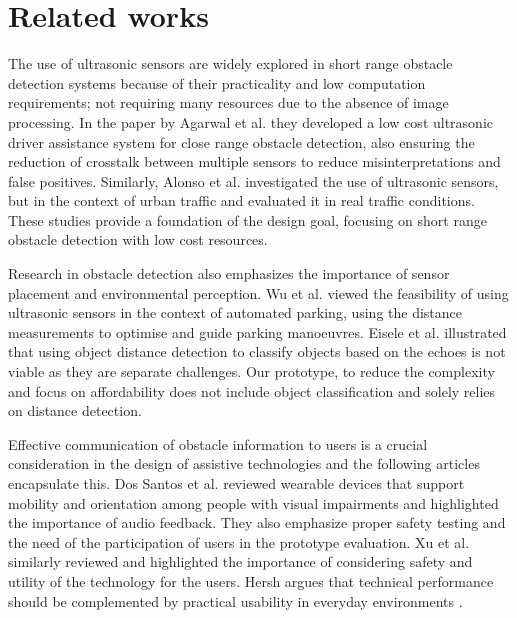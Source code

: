 \documentclass[12pt]{article}
\begin{document}
\section{Related works}
The use of ultrasonic sensors are widely explored in short range obstacle detection systems because of their practicality and low computation requirements; not requiring many resources due to the absence of image processing. In the paper by Agarwal et al. \cite{agarwal2009cost} they developed a low cost ultrasonic driver assistance system for close range obstacle detection, also ensuring the reduction of crosstalk between multiple sensors to reduce misinterpretations and false positives. Similarly, Alonso et al. \cite{alonso2011ultasonic} investigated the use of ultrasonic sensors, but in the context of urban traffic and evaluated it in real traffic conditions. These studies provide a foundation of the design goal, focusing on short range obstacle detection with low cost resources.

Research in obstacle detection also emphasizes the importance of sensor placement and environmental perception. Wu et al. \cite{wu2019implementation} viewed the feasibility of using ultrasonic sensors in the context of automated parking, using the distance measurements to optimise and guide parking manoeuvres. Eisele et al. \cite{eisele2024relevance} illustrated that using object distance detection to classify objects based on the echoes is not viable as they are separate challenges. Our prototype, to reduce the complexity and focus on affordability does not include object classification and solely relies on distance detection.

Effective communication of obstacle information to users is a crucial consideration in the design of assistive technologies and the following articles encapsulate this. Dos Santos et al. \cite{dos2021systematic} reviewed wearable devices that support mobility and orientation among people with visual impairments and highlighted the importance of audio feedback. They also emphasize proper safety testing and the need of the participation of users in the prototype evaluation. Xu et al. \cite{xu2023wearable} similarly reviewed and highlighted the importance of considering safety and utility of the technology for the users. Hersh argues that technical performance should be complemented by practical usability in everyday environments \cite{hersh2022wearable}.
\end{document}
